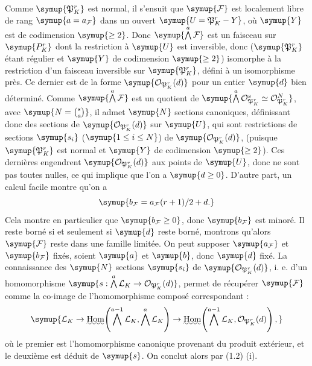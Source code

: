 Comme $\symup{\mathfrak P^r_K}$ est normal, il s'ensuit que $\symup{\mathcal F}$ est localement
libre de rang $\symup{a=a_{\mathcal F}}$ dans un ouvert
$\symup{U=\mathfrak P^r_K-Y}$, où $\symup{Y}$ est de codimension $\symup{\geq2}$. Donc
$\symup{\mathop{\bigwedge}\limits^{a}\mathcal F}$ est un faisceau sur $\symup{P^r_K}$ dont la restriction
à $\symup{U}$ est inversible, donc ($\symup{\mathfrak P^r_K}$ étant régulier et $\symup{Y}$ de
codimension $\symup{\geq2}$) isomorphe à la restriction d'un faisceau inversible sur
$\symup{\mathfrak P^r_K}$, défini à un isomorphisme près. Ce dernier est de la forme
$\symup{\mathcal O_{\mathfrak P^r_K}(d)}$ pour un entier $\symup{d}$ bien déterminé. Comme
$\symup{\mathop{\bigwedge}\limits^{a}\mathcal F}$ est un quotient de
$\symup{\mathop{\bigwedge}\limits^{a}\mathcal O_{\mathfrak P^r_K}^{s}\simeq
\mathcal O_{\mathfrak P^r_K}^{N}}$, avec $\symup{N=\binom{s}{a}}$, il admet $\symup{N}$ sections
canoniques, définissant donc des sections de
$\symup{\mathcal O_{\mathfrak P^r_K}(d)}$ sur $\symup{U}$, qui sont restrictions de sections
$\symup{s_i}$ ($\symup{1\leq i\leq N}$) de $\symup{\mathcal O_{\mathfrak P^r_K}(d)}$, (puisque
$\symup{\mathfrak P^r_K}$ est normal et $\symup{Y}$ de codimension $\symup{\geq2}$). Ces dernières
engendrent $\symup{\mathcal O_{\mathfrak P^r_K}(d)}$ aux points de $\symup{U}$, donc ne sont pas
toutes nulles, ce qui implique que l'on a $\symup{d\geq0}$. D'autre part, un calcul
facile montre qu'on a
\[
\symup{b_{\mathcal F}=a_{\mathcal F}(r+1)/2+d.}
\]
Cela montre en particulier que $\symup{b_{\mathcal F}\geq0}$, donc $\symup{b_{\mathcal F}}$ est
minoré. Il reste borné si et seulement si $\symup{d}$ reste borné, montrons qu'alors
$\symup{\mathcal F}$ reste dans une famille limitée. On peut supposer
$\symup{a_{\mathcal F}}$ et $\symup{b_{\mathcal F}}$ fixés, soient $\symup{a}$ et $\symup{b}$, donc $\symup{d}$ fixé.
La connaissance des $\symup{N}$ sections $\symup{s_i}$ de $\symup{\mathcal O_{\mathfrak P^r_K}(d)}$,
i. e. d'un homomorphisme
$\symup{s:\mathop{\bigwedge}\limits^{a}\mathcal L_K\to\mathcal O_{\mathfrak P^r_K}(d)}$, permet de récupérer $\symup{\mathcal F}$ comme la co-image de l'homomorphisme composé
correspondant :
\[
\symup{\mathcal L_K\to
\mathop{\text{\uwave{Hom}}}\nolimits\!\left(\mathop{\bigwedge}\limits^{a-1}\mathcal L_K,
\mathop{\bigwedge}\limits^{a}\mathcal L_K\right)\to
\mathop{\text{\uwave{Hom}}}\nolimits\!\left(\mathop{\bigwedge}\limits^{a-1}\mathcal L_K,
\mathcal O_{\mathfrak P^r_K}(d)\right),}
\]
où le premier est l'homomorphisme canonique provenant du produit extérieur, et
le deuxième est déduit de $\symup{s}$. On conclut alors par (1.2) (i).

